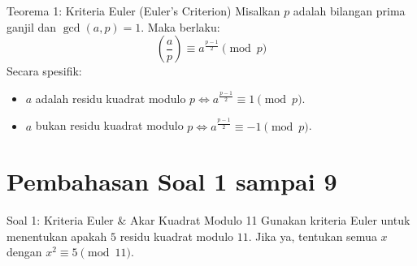 \documentclass[11pt,a4paper]{article}
\begin{document}
\begin{tipsbox}{Teorema 1: Kriteria Euler (Euler's Criterion)}
Misalkan $p$ adalah bilangan prima ganjil dan $\gcd(a, p) = 1$. Maka berlaku:
\[
\left(\frac{a}{p}\right) \equiv a^{\frac{p-1}{2}} \pmod p
\]
Secara spesifik:
\begin{itemize}[leftmargin=*]
    \item $a$ adalah residu kuadrat modulo $p \iff a^{\frac{p-1}{2}} \equiv 1 \pmod p$.
    \item $a$ bukan residu kuadrat modulo $p \iff a^{\frac{p-1}{2}} \equiv -1 \pmod p$.
\end{itemize}
\end{tipsbox}

\vspace{0.2cm}

\section{Pembahasan Soal 1 sampai 9}

\begin{soalbox}{Soal 1: Kriteria Euler \& Akar Kuadrat Modulo 11}
Gunakan kriteria Euler untuk menentukan apakah $5$ residu kuadrat modulo $11$. Jika ya, tentukan semua $x$ dengan $x^2 \equiv 5 \pmod{11}$.
\end{soalbox}
\end{document}
